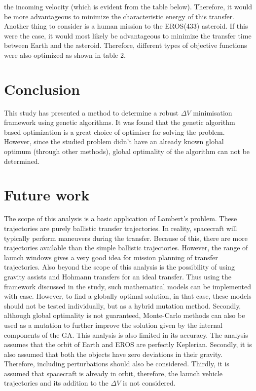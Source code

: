 \documentclass[11pt,a4paper]{article}
\begin{document}
\begin{multicols}{2}
the incoming velocity (which is evident from the table below). Therefore, it would be more advantageous to minimize the characteristic energy of this transfer. Another thing to consider is a human mission to the EROS(433) asteroid. If this were the case, it would most likely be advantageous to minimize the transfer time between Earth and the asteroid. Therefore, different types of objective functions were also optimized as shown in table 2.


\section{Conclusion}
This study has presented a method to determine a robust $\Delta V$ minimisation framework using genetic algorithms. It was found that the genetic algorithm based optimization is a great choice of optimiser for solving the problem. However, since the studied problem didn't have an already known global optimum (through other methods), global optimality of the algorithm can not be determined.

\section{Future work}

The scope of this analysis is a basic application of Lambert’s problem. These trajectories are purely ballistic transfer trajectories. In reality, spacecraft will typically perform maneuvers during the transfer. Because of this, there are more trajectories available than the simple ballistic trajectories. However, the range of launch windows gives a very good idea for mission planning of transfer trajectories. Also beyond the scope of this analysis is the possibility of using gravity assists and Hohmann transfers for an ideal transfer. Thus using the framework discussed in the study, such mathematical models can be implemented with ease. However, to find a globally optimal solution, in that case, these models should not be tested individually, but as a hybrid mutation method. Secondly, although global optimality is not guaranteed, Monte-Carlo methods can also be used as a mutation to further improve the solution given by the internal components of the GA. This analysis is also limited in its accuracy. The analysis assumes that the orbit of Earth and EROS are perfectly Keplerian. Secondly, it is also assumed that both the objects have zero deviations in their gravity. Therefore, including perturbations should also be considered. Thirdly, it is assumed that spacecraft is already in orbit, therefore, the launch vehicle trajectories and its addition to the $\Delta V$ is not considered.

\end{multicols}
\end{document}
